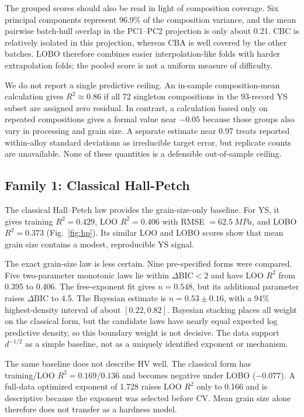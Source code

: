 \documentclass[5p,times,twocolumn]{elsarticle}
\newcommand{\familyone}{Classical Hall-Petch}
\begin{document}
The grouped scores should also be read in light of composition coverage. Six principal components represent 96.9\% of the composition variance, and the mean pairwise batch-hull overlap in the PC1--PC2 projection is only about 0.21. CBC is relatively isolated in this projection, whereas CBA is well covered by the other batches. LOBO therefore combines easier interpolation-like folds with harder extrapolation folds; the pooled score is not a uniform measure of difficulty.

We do not report a single predictive ceiling. An in-sample composition-mean calculation gives $R^2\approx0.86$ if all 72 singleton compositions in the 93-record YS subset are assigned zero residual. In contrast, a calculation based only on repeated compositions gives a formal value near $-0.05$ because those groups also vary in processing and grain size. A separate estimate near 0.97 treats reported within-alloy standard deviations as irreducible target error, but replicate counts are unavailable. None of these quantities is a defensible out-of-sample ceiling.

\subsection{Family 1: \familyone}

The classical Hall--Petch law provides the grain-size-only baseline. For YS, it gives training $R^2=0.429$, LOO $R^2=0.406$ with RMSE $=\SI{62.5}{MPa}$, and LOBO $R^2=0.373$ (Fig.~\ref{fig:hp}). Its similar LOO and LOBO scores show that mean grain size contains a modest, reproducible YS signal.

The exact grain-size law is less certain. Nine pre-specified forms were compared. Five two-parameter monotonic laws lie within $\Delta\mathrm{BIC}<2$ and have LOO $R^2$ from 0.395 to 0.406. The free-exponent fit gives $n=0.548$, but its additional parameter raises $\Delta\mathrm{BIC}$ to 4.5. The Bayesian estimate is $n=0.53\pm0.16$, with a 94\% highest-density interval of about $[0.22,0.82]$. Bayesian stacking places all weight on the classical form, but the candidate laws have nearly equal expected log predictive density, so this boundary weight is not decisive. The data support $d^{-1/2}$ as a simple baseline, not as a uniquely identified exponent or mechanism.

The same baseline does not describe HV well. The classical form has training/LOO $R^2=0.169/0.136$ and becomes negative under LOBO ($-0.077$). A full-data optimized exponent of 1.728 raises LOO $R^2$ only to 0.166 and is descriptive because the exponent was selected before CV. Mean grain size alone therefore does not transfer as a hardness model.
\end{document}
